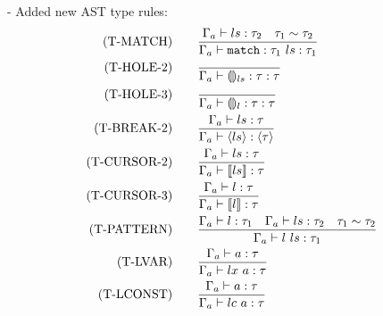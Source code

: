 \documentclass[10pt,a4paper,english]{article}
\begin{document}
- Added new AST type rules:
\begin{align}
  (\text{T-MATCH})\qquad&\frac{\Gamma_{a} \vdash ls : \tau_2\quad\tau_1\sim\tau_2}{\Gamma_{a} \vdash \texttt{match} : \tau_1~ls : \tau_1}\\
  (\text{T-HOLE-2})\qquad&\frac{}{\Gamma_{a} \vdash \llparenthesis\rrparenthesis_{ls} : \tau : \tau}\\
  (\text{T-HOLE-3})\qquad&\frac{}{\Gamma_{a} \vdash \llparenthesis\rrparenthesis_{l} : \tau : \tau}\\
  (\text{T-BREAK-2})\qquad&\frac{\Gamma_{a} \vdash ls : \tau}{\Gamma_{a} \vdash \langle ls \rangle : \langle \tau \rangle}\\
  (\text{T-CURSOR-2})\qquad&\frac{\Gamma_{a} \vdash ls : \tau}{\Gamma_{a} \vdash \llbracket ls \rrbracket : \tau}\\
  (\text{T-CURSOR-3})\qquad&\frac{\Gamma_{a} \vdash l : \tau}{\Gamma_{a} \vdash \llbracket l \rrbracket : \tau}\\
  (\text{T-PATTERN})\qquad&\frac{\Gamma_{a} \vdash l : \tau_1\quad\Gamma_{a} \vdash ls : \tau_2\quad \tau_1\sim\tau_2}{\Gamma_{a} \vdash l~ls : \tau_1}\\
  (\text{T-LVAR})\qquad&\frac{\Gamma_{a} \vdash a : \tau}{\Gamma_{a} \vdash lx~a : \tau}\\
  (\text{T-LCONST})\qquad&\frac{\Gamma_{a} \vdash a : \tau}{\Gamma_{a} \vdash lc~a : \tau}
\end{align}
\end{document}

